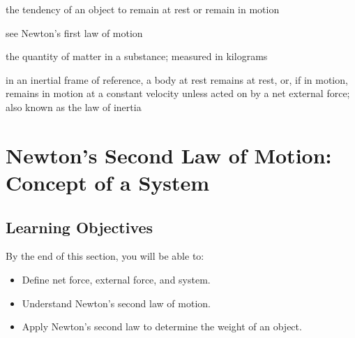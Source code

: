 \documentclass[
]{book}
\providecommand{\tightlist}{%
  \setlength{\itemsep}{0pt}\setlength{\parskip}{0pt}}
\newenvironment{learning-objectives}{}{}
\begin{document}
\begin{description}
\tightlist
\item[inertia]
the tendency of an object to remain at rest or remain in motion
\end{description}

\begin{description}
\tightlist
\item[law of inertia]
see Newton's first law of motion
\end{description}

\begin{description}
\tightlist
\item[mass]
the quantity of matter in a substance; measured in kilograms
\end{description}

\begin{description}
\tightlist
\item[Newton's first law of motion]
in an inertial frame of reference, a body at rest remains at rest,
or, if in motion, remains in motion at a constant velocity unless
acted on by a net external force; also known as the law of inertia
\end{description}

\hypertarget{newtons-second-law-of-motion-concept-of-a-system}{%
\section{Newton's Second Law of Motion: Concept of a System}\label{newtons-second-law-of-motion-concept-of-a-system}}

\hypertarget{fs-id1899128}{}
\begin{learning-objectives}

\hypertarget{learning-objectives-14}{%
\subsection{Learning Objectives}\label{learning-objectives-14}}

By the end of this section, you will be able to:

\begin{itemize}
\tightlist
\item
  Define net force, external force, and system.
\item
  Understand Newton's second law of motion.
\item
  Apply Newton's second law to determine the weight of an object.
\end{itemize}

\end{learning-objectives}
\end{document}
